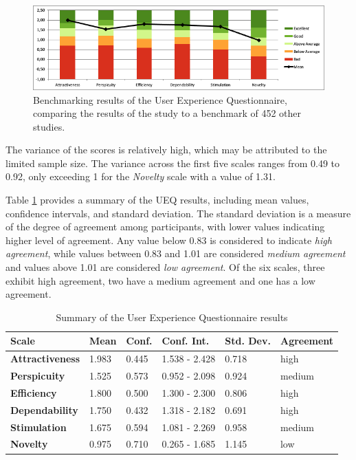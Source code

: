 \begin{figure}[htb]
	\includegraphics[width=\textwidth]{figures/ueq-2.png}
  \caption{Benchmarking results of the User Experience Questionnaire, comparing the results of the study to a benchmark of 452 other studies.}
  \label{fig:ueq-2}
\end{figure}

The variance of the scores is relatively high, which may be attributed to the limited sample size.
The variance across the first five scales ranges from 0.49 to 0.92, only exceeding 1 for the \emph{Novelty} scale with a value of 1.31.

Table \ref{tab:ueq-summary} provides a summary of the UEQ results, including mean values, confidence intervals, and standard deviation.
The standard deviation is a measure of the degree of agreement among participants, with lower values indicating higher level of agreement.
Any value below 0.83 is considered to indicate \emph{high agreement}, while values between 0.83 and 1.01 are considered \emph{medium agreement} and values above 1.01 are considered \emph{low agreement}.
Of the six scales, three exhibit high agreement, two have a medium agreement and one has a low agreement.

\begin{table}[htb]
  \centering
  \begin{tabularx}{\textwidth}{|X|l|l|l|l|l|}
  \hline
      \textbf{Scale} &  \textbf{Mean}  &  \textbf{Conf.} &  \textbf{Conf. Int.} &  \textbf{Std. Dev.} & \textbf{Agreement}\\ \hline
      \textbf{Attractiveness} & 1.983  & 0.445 & 1.538 - 2.428 & 0.718 & high \\ \hline
      \textbf{Perspicuity} & 1.525 & 0.573 & 0.952 - 2.098 & 0.924 & medium\\ \hline
      \textbf{Efficiency} & 1.800 & 0.500 & 1.300 - 2.300 & 0.806 & high \\ \hline
      \textbf{Dependability} & 1.750 & 0.432 & 1.318 - 2.182 & 0.691 & high \\ \hline
      \textbf{Stimulation} & 1.675 & 0.594 & 1.081 - 2.269 & 0.958 & medium \\ \hline
      \textbf{Novelty} & 0.975 & 0.710 & 0.265 - 1.685 & 1.145 & low \\ \hline
  \end{tabularx}
  \vspace{6pt}
  \caption{Summary of the User Experience Questionnaire results}
  \label{tab:ueq-summary}
\end{table}

